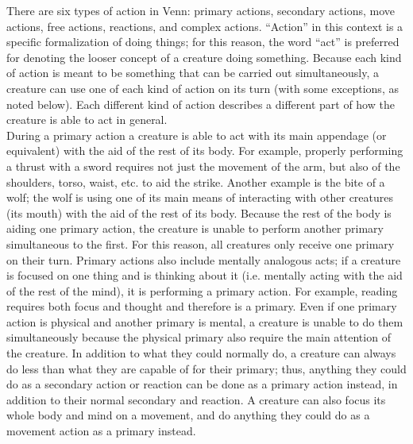 \documentclass[letterpaper,titlepage,openany,twocolumn]{book}
\begin{document}
There are six types of action in Venn: primary actions, secondary actions, move actions, free actions, reactions, and complex actions. “Action” in this context is a specific formalization of doing things; for this reason, the word “act” is preferred for denoting the looser concept of a creature doing something. Because each kind of action is meant to be something that can be carried out simultaneously, a creature can use one of each kind of action on its turn (with some exceptions, as noted below). Each different kind of action describes a different part of how the creature is able to act in general.\\

During a primary action a creature is able to act with its main appendage (or equivalent) with the aid of the rest of its body. For example, properly performing a thrust with a sword requires not just the movement of the arm, but also of the shoulders, torso, waist, etc. to aid the strike. Another example is the bite of a wolf; the wolf is using one of its main means of interacting with other creatures (its mouth) with the aid of the rest of its body. Because the rest of the body is aiding one primary action, the creature is unable to perform another primary simultaneous to the first. For this reason, all creatures only receive one primary on their turn. Primary actions also include mentally analogous acts; if a creature is focused on one thing and is thinking about it (i.e. mentally acting with the aid of the rest of the mind), it is performing a primary action. For example, reading requires both focus and thought and therefore is a primary. Even if one primary action is physical and another primary is mental, a creature is unable to do them simultaneously because the physical primary also require the main attention of the creature. In addition to what they could normally do, a creature can always do less than what they are capable of for their primary; thus, anything they could do as a secondary action or reaction can be done as a primary action instead, in addition to their normal secondary and reaction. A creature can also focus its whole body and mind on a movement, and do anything they could do as a movement action as a primary instead.\\
\end{document}
